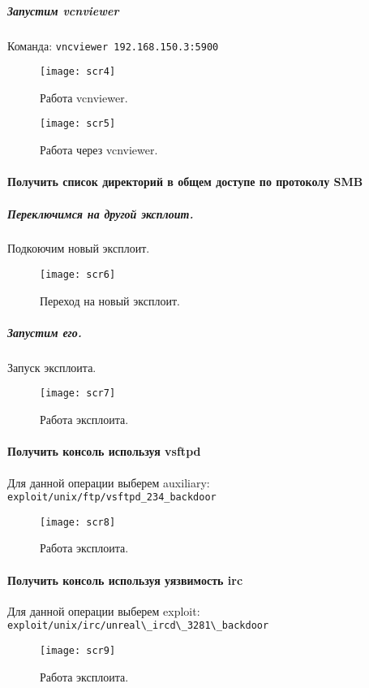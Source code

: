 \documentclass{article}
\begin{document}
 \subparagraph{Запустим vcnviewer\\}
 Команда: \verb'vncviewer 192.168.150.3:5900'
 \begin{figure}[h!]
 	\centering
 	\texttt{[image: scr4]}
 	\caption{Работа vcnviewer.}
 \end{figure}
 \begin{figure}[h!]
 	\centering
 	\texttt{[image: scr5]}
 	\caption{Работа через vcnviewer.}
 \end{figure}
 
 \paragraph{Получить список директорий в общем доступе по протоколу SMB\\}
 \subparagraph{Переключимся на другой эксплоит.\\}
 Подкоючим новый эксплоит.
 \begin{figure}[h!]
 	\centering
 	\texttt{[image: scr6]}
 	\caption{Переход на новый эксплоит.}
 \end{figure}
 \subparagraph{Запустим его.\\}
 Запуск эксплоита.
 \begin{figure}[h!]
 	\centering
 	\texttt{[image: scr7]}
 	\caption{Работа эксплоита.}
 \end{figure}
 \paragraph{Получить консоль используя vsftpd\\}
 Для данной операции выберем auxiliary: \verb'exploit/unix/ftp/vsftpd_234_backdoor'
 
 \begin{figure}[h!]
 	\centering
 	\texttt{[image: scr8]}
 	\caption{Работа эксплоита.}
 \end{figure}
 
 \paragraph{Получить консоль используя уязвимость irc\\}
 Для данной операции выберем exploit: \verb'exploit/unix/irc/unreal\_ircd\_3281\_backdoor'
 \begin{figure}[h!]
 	\centering
 	\texttt{[image: scr9]}
 	\caption{Работа эксплоита.}
 \end{figure}
\end{document}
